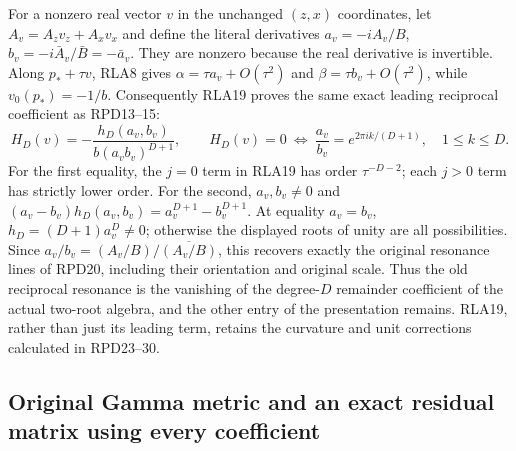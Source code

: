 For a nonzero real vector $v$ in the unchanged $(z,x)$ coordinates,
let $A_v=A_zv_z+A_xv_x$ and define the literal derivatives
$a_v=-iA_v/B$, $b_v=-i\bar A_v/\bar B=-\bar a_v$.
They are nonzero because the real derivative is invertible.  Along
$p_*+\tau v$, RLA8 gives
$\alpha=\tau a_v+O(\tau^2)$ and
$\beta=\tau b_v+O(\tau^2)$, while $v_0(p_*)=-1/b$.
Consequently RLA19 proves the same exact leading reciprocal
coefficient as RPD13--15:
\[
 H_D(v)=-\frac{h_D(a_v,b_v)}{b(a_vb_v)^{D+1}},\qquad
 H_D(v)=0\ \Longleftrightarrow\
 \frac{a_v}{b_v}=e^{2\pi ik/(D+1)},\quad1\le k\le D.
 \tag{RLA20}
\]
For the first equality, the $j=0$ term in RLA19 has order
$\tau^{-D-2}$; each $j>0$ term has strictly lower order.
For the second, $a_v,b_v\ne0$ and
$(a_v-b_v)h_D(a_v,b_v)=a_v^{D+1}-b_v^{D+1}$.
At equality $a_v=b_v$, $h_D=(D+1)a_v^D\ne0$; otherwise the
displayed roots of unity are all possibilities.
Since $a_v/b_v=(A_v/B)/\overline{(A_v/B)}$, this recovers exactly
the original resonance lines of RPD20, including their orientation
and original scale.  Thus the old reciprocal resonance is the
vanishing of the degree-$D$ remainder coefficient of the actual
two-root algebra, and the other entry of the presentation remains.
RLA19, rather than just its leading term, retains the curvature
and unit corrections calculated in RPD23--30.

\subsection{Original Gamma metric and an exact residual matrix using every coefficient}

